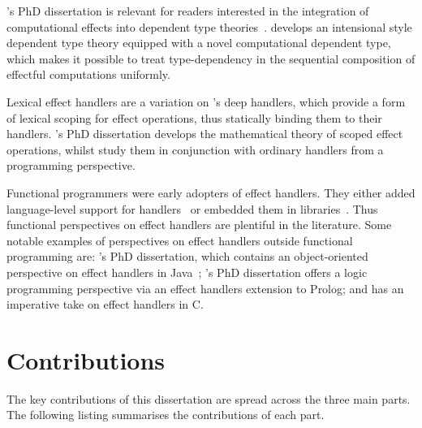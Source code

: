 \documentclass[12pt,phd,lfcs,twoside,openright,logo,leftchapter,normalheadings]{infthesis}
\theoremstyle{plain}
\theoremstyle{definition}
\begin{document}
\citeauthor{Ahman17}'s PhD dissertation is relevant for readers
interested in the integration of computational effects into dependent
type theories~\cite{Ahman17}. \citeauthor{Ahman17} develops an
intensional \citet{MartinLof84} style dependent type theory equipped
with a novel computational dependent type, which makes it possible to
treat type-dependency in the sequential composition of effectful
computations uniformly.

Lexical effect handlers are a variation on \citeauthor{PlotkinP09}'s
deep handlers, which provide a form of lexical scoping for effect
operations, thus statically binding them to their handlers.
%
\citeauthor{Geron19}'s PhD dissertation develops the mathematical
theory of scoped effect operations, whilst \citet{BiernackiPPS20}
study them in conjunction with ordinary handlers from a programming
perspective.


Functional programmers were early adopters of effect handlers. They
either added language-level support for handlers~
\cite{Hillerstrom15,DolanWSYM15,BiernackiPPS18,Leijen17,BauerP15,BrachthauserSO20a,LindleyMM17,Chiusano20}
or embedded them in
libraries~\cite{KiselyovSS13,KiselyovI15,KiselyovS16,KammarLO13,BrachthauserS17,Brady13,XieL20}. Thus
functional perspectives on effect handlers are plentiful in the
literature. Some notable examples of perspectives on effect handlers
outside functional programming are: \citeauthor{Brachthauser20}'s PhD
dissertation, which contains an object-oriented perspective on effect
handlers in Java~\cite{Brachthauser20}; \citeauthor{Saleh19}'s PhD
dissertation offers a logic programming perspective via an effect
handlers extension to Prolog; and \citet{Leijen17b} has an imperative
take on effect handlers in C.

\section{Contributions}
The key contributions of this dissertation are spread across the three
main parts. The following listing summarises the contributions of each
part.
\end{document}

